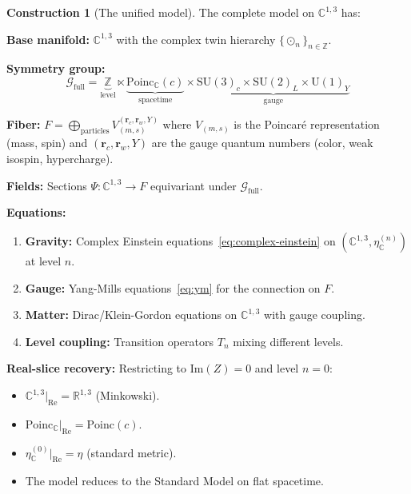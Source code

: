\documentclass[12pt]{article}
\theoremstyle{plain}
\theoremstyle{definition}
\newtheorem{construction}[theorem]{Construction}
\theoremstyle{remark}
\newcommand{\Poinc}{\mathrm{Poinc}}
\newcommand{\SU}{\mathrm{SU}}
\newcommand{\UU}{\mathrm{U}}
\newcommand{\CC}{\mathbb{C}}
\newcommand{\RR}{\mathbb{R}}
\newcommand{\ZZ}{\mathbb{Z}}
\begin{document}
\begin{construction}[The unified model]\label{constr:full}
The complete model on $\CC^{1,3}$ has:

\textbf{Base manifold:} $\CC^{1,3}$ with the complex twin hierarchy $\{\odot_n\}_{n \in \ZZ}$.

\textbf{Symmetry group:}
\begin{equation}
\mathcal{G}_{\mathrm{full}} = \underbrace{\ZZ}_{\text{level}} \ltimes \underbrace{\Poinc_\CC(c)}_{\text{spacetime}} \times \underbrace{\SU(3)_c \times \SU(2)_L \times \UU(1)_Y}_{\text{gauge}}
\end{equation}

\textbf{Fiber:} $F = \bigoplus_{\text{particles}} V_{(m,s)}^{(\mathbf{r}_c, \mathbf{r}_w, Y)}$ where $V_{(m,s)}$ is the Poincar\'e representation (mass, spin) and $(\mathbf{r}_c, \mathbf{r}_w, Y)$ are the gauge quantum numbers (color, weak isospin, hypercharge).

\textbf{Fields:} Sections $\Psi: \CC^{1,3} \to F$ equivariant under $\mathcal{G}_{\mathrm{full}}$.

\textbf{Equations:}
\begin{enumerate}[label=(\roman*)]
    \item \textbf{Gravity:} Complex Einstein equations~\eqref{eq:complex-einstein} on $(\CC^{1,3}, \eta_\CC^{(n)})$ at level $n$.
    \item \textbf{Gauge:} Yang-Mills equations~\eqref{eq:ym} for the connection on $F$.
    \item \textbf{Matter:} Dirac/Klein-Gordon equations on $\CC^{1,3}$ with gauge coupling.
    \item \textbf{Level coupling:} Transition operators $T_n$ mixing different levels.
\end{enumerate}

\textbf{Real-slice recovery:} Restricting to $\mathrm{Im}(Z) = 0$ and level $n = 0$:
\begin{itemize}
    \item $\CC^{1,3}|_{\mathrm{Re}} = \RR^{1,3}$ (Minkowski).
    \item $\Poinc_\CC|_{\mathrm{Re}} = \Poinc(c)$.
    \item $\eta_\CC^{(0)}|_{\mathrm{Re}} = \eta$ (standard metric).
    \item The model reduces to the Standard Model on flat spacetime.
\end{itemize}
\end{construction}
\end{document}
